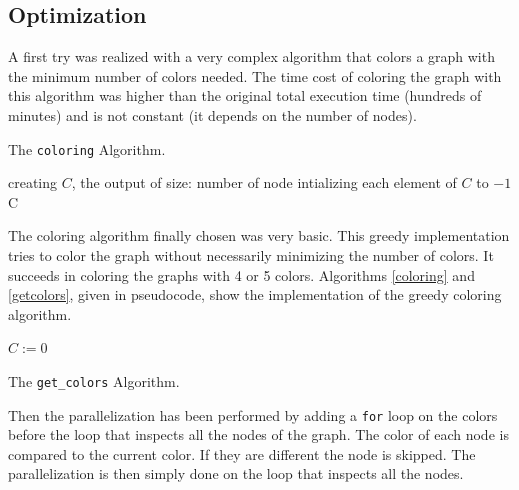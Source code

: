 \documentclass[fleqn,11pt]{SelfArx} %
\theoremstyle{definition}
\begin{document}
\subsection{Optimization}

A first try was realized with a very complex algorithm that colors a graph with the minimum number of colors needed. The time cost of coloring the graph with this algorithm was higher than the original total execution time (hundreds of minutes) and is not constant (it depends on the number of nodes).

\begin{algorithm}[!h]
\caption{The \texttt{coloring} Algorithm.}

\BlankLine

creating $C$, the output of size: number of node\;
intializing each element of $C$ to $-1$\;
\Return C\;

\label{coloring}
\end{algorithm}

The coloring algorithm finally chosen was very basic. This greedy implementation tries to color the graph without necessarily minimizing the number of colors. It succeeds in coloring the graphs with 4 or 5 colors. Algorithms \ref{coloring} and \ref{getcolors}, given in pseudocode, show the implementation of the greedy coloring algorithm.

\begin{algorithm}[!h]
\SetAlgoLined
{}

\BlankLine

$C := 0$\;

\caption{The \texttt{get\_colors} Algorithm.}
\label{getcolors}
\end{algorithm}

Then the parallelization has been performed by adding a \verb+for+ loop on the colors before the loop that inspects all the nodes of the graph. The color of each node is compared to the current color. If they are different the node is skipped. The parallelization is then simply done on the loop that inspects all the nodes.
\end{document}
